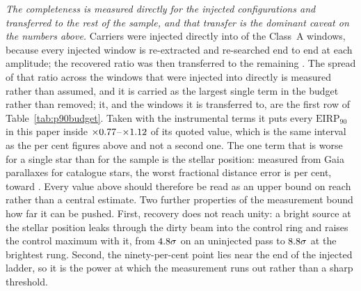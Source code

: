 \emph{The completeness is measured directly for the injected
configurations and transferred to the rest of the sample, and that transfer
is the dominant caveat on the numbers above.} Carriers were injected
directly into \NInjWinA{} of the \NWinA{} Class~A windows, because every
injected window is re-extracted and re-searched end to end at each
amplitude; the recovered ratio was then transferred to the remaining
\NTransferWinA. The spread of that ratio across the \BudTransN{} windows
that were injected into directly is measured rather than assumed, and it is
carried as the largest single term in the budget rather than removed; it, and
the \BudTransNTransferred{} windows it is transferred to, are the first row
of Table~\ref{tab:p90budget}. Taken with the instrumental terms it puts every
$\mathrm{EIRP}_{90}$ in this paper inside
$\times0.77$--$\times1.12$ of its quoted value, which
is the same interval as the per cent figures above and not a second one. The one
term that is worse for a single star than for the sample is the stellar
position: measured from Gaia parallaxes for \BudPlxNStar{} catalogue stars,
the worst fractional distance error is \BudPlxWorstPct{} per cent, toward
\BudPlxWorstStar. Every value above should therefore
be read as an upper bound on reach rather than a central estimate. Two
further properties of the measurement bound how far it can be pushed. First,
recovery does not reach unity: a bright source at the stellar position leaks
through the dirty beam into the control ring and raises the control maximum
with it, from $4.8\sigma$ on an uninjected pass to
$8.8\sigma$ at the brightest rung. Second, the
ninety-per-cent point lies near the end of the injected ladder, so it is the
power at which the measurement runs out rather than a sharp threshold.

\begin{table}
\centering
\scriptsize
\caption{The $\mathrm{EIRP}_{90}$ error budget. The first two rows are
two-sided and combine in quadrature to the one interval quoted in the text,
$-\EirpNinetyPctLo$ to $+\EirpNinetyPctHi$ per cent, of which the larger contribution
is \BudDominant. The decorrelation term is a one-sided bias declared from
the literature rather than measured here, and is therefore quoted apart
from the interval rather than added to it: an uncorrected bias is not an
error bar. Every row is a fractional effect on
$\mathrm{EIRP}_{90}$, so the budget applies unchanged to every limit in
this paper.}
\label{tab:p90budget}
\tiny
\setlength{\tabcolsep}{2pt}

\end{table}

